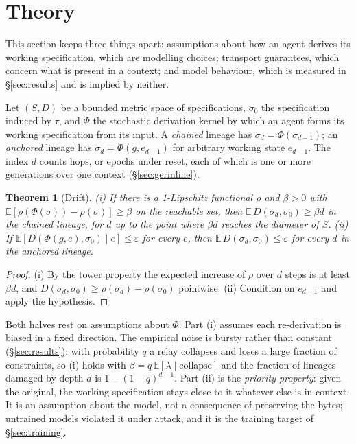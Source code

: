 \documentclass[11pt]{article}
\newtheorem{theorem}{Theorem}
\begin{document}
\section{Theory}\label{sec:theory}

This section keeps three things apart: assumptions about how an agent derives its working specification, which are modelling choices; transport guarantees, which concern what is present in a context; and model behaviour, which is measured in \S\ref{sec:results} and is implied by neither.

Let $(S,D)$ be a bounded metric space of specifications, $\sigma_0$ the specification induced by $\tau$, and $\Phi$ the stochastic derivation kernel by which an agent forms its working specification from its input. A \emph{chained} lineage has $\sigma_d=\Phi(\sigma_{d-1})$; an \emph{anchored} lineage has $\sigma_d=\Phi(g,e_{d-1})$ for arbitrary working state $e_{d-1}$. The index $d$ counts hops, or epochs under reset, each of which is one or more generations over one context (\S\ref{sec:germline}).

\begin{theorem}[Drift]\label{thm:drift}
(i) If there is a 1-Lipschitz functional $\rho$ and $\beta>0$ with $\mathbb{E}[\rho(\Phi(\sigma))-\rho(\sigma)]\ge\beta$ on the reachable set, then $\mathbb{E}\,D(\sigma_d,\sigma_0)\ge\beta d$ in the chained lineage, for $d$ up to the point where $\beta d$ reaches the diameter of $S$. (ii) If $\mathbb{E}[D(\Phi(g,e),\sigma_0)\mid e]\le\varepsilon$ for every $e$, then $\mathbb{E}\,D(\sigma_d,\sigma_0)\le\varepsilon$ for every $d$ in the anchored lineage.
\end{theorem}
\begin{proof}
(i) By the tower property the expected increase of $\rho$ over $d$ steps is at least $\beta d$, and $D(\sigma_d,\sigma_0)\ge\rho(\sigma_d)-\rho(\sigma_0)$ pointwise. (ii) Condition on $e_{d-1}$ and apply the hypothesis.
\end{proof}

Both halves rest on assumptions about $\Phi$. Part (i) assumes each re-derivation is biased in a fixed direction. The empirical noise is bursty rather than constant (\S\ref{sec:results}): with probability $q$ a relay collapses and loses a large fraction of constraints, so (i) holds with $\beta=q\,\mathbb{E}[\lambda\mid\text{collapse}]$ and the fraction of lineages damaged by depth $d$ is $1-(1-q)^{d-1}$. Part (ii) is the \emph{priority property}: given the original, the working specification stays close to it whatever else is in context. It is an assumption about the model, not a consequence of preserving the bytes; untrained models violated it under attack, and it is the training target of \S\ref{sec:training}.
\end{document}
